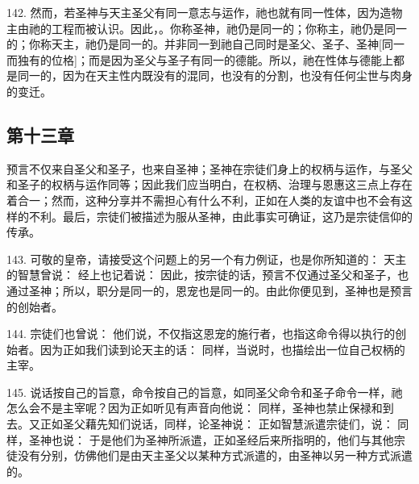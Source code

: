 142. 然而，若圣神与天主圣父有同一意志与运作，祂也就有同一性体，因为造物主由祂的工程而被认识。因此，。你称圣神，祂仍是同一的；你称主，祂仍是同一的；你称天主，祂仍是同一的。并非同一到祂自己同时是圣父、圣子、圣神[同一而独有的位格]；而是因为圣父与圣子有同一的德能。所以，祂在性体与德能上都是同一的，因为在天主性内既没有的混同，也没有的分割，也没有任何尘世与肉身的变迁。\par


\subsection{第十三章}

预言不仅来自圣父和圣子，也来自圣神；圣神在宗徒们身上的权柄与运作，与圣父和圣子的权柄与运作同等；因此我们应当明白，在权柄、治理与恩惠这三点上存在着合一；然而，这种分享并不需担心有什么不利，正如在人类的友谊中也不会有这样的不利。最后，宗徒们被描述为服从圣神，由此事实可确证，这乃是宗徒信仰的传承。\par

143. 可敬的皇帝，请接受这个问题上的另一个有力例证，也是你所知道的： 天主的智慧曾说： 经上也记着说： 因此，按宗徒的话，预言不仅通过圣父和圣子，也通过圣神；所以，职分是同一的，恩宠也是同一的。由此你便见到，圣神也是预言的创始者。\par

144. 宗徒们也曾说： 他们说，不仅指这恩宠的施行者，也指这命令得以执行的创始者。因为正如我们读到论天主的话： 同样，当说时，也描绘出一位自己权柄的主宰。\par

145. 说话按自己的旨意，命令按自己的旨意，如同圣父命令和圣子命令一样，祂怎么会不是主宰呢？因为正如听见有声音向他说： 同样，圣神也禁止保禄和到去。又正如圣父藉先知们说话，同样，论圣神说： 正如智慧派遣宗徒们，说： 同样，圣神也说： 于是他们为圣神所派遣，正如圣经后来所指明的，他们与其他宗徒没有分别，仿佛他们是由天主圣父以某种方式派遣的，由圣神以另一种方式派遣的。\par

